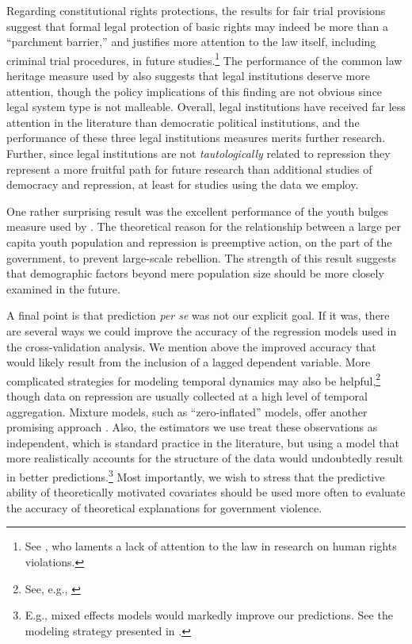 \documentclass[12pt]{article}
\begin{document}
Regarding constitutional rights protections, the results for fair trial provisions suggest that formal legal protection of basic rights may indeed be more than a ``parchment barrier,'' \citep[See][]{KeithTatePoe2009} and justifies more attention to the law itself, including criminal trial procedures, in future studies.\footnote{See \citet{Cross1999}, who laments a lack of attention to the law in research on human rights violations.} The performance of the common law heritage measure used by \citet{Mitchell2013} also suggests that legal institutions deserve more attention, though the policy implications of this finding are not obvious since legal system type is not malleable. Overall, legal institutions have received far less attention in the literature than democratic political institutions, and the performance of these three legal institutions measures merits further research. Further, since legal institutions are not {\it tautologically} related to repression they represent a more fruitful path for future research than additional studies of democracy and repression, at least for studies using the data we employ. 

One rather surprising result was the excellent performance of the youth bulges measure used by \citet{NordasDavenport2013}. The theoretical reason for the relationship between a large per capita youth population and repression is preemptive action, on the part of the government, to prevent large-scale rebellion. The strength of this result suggests that demographic factors beyond mere population size should be more closely examined in the future. 

A final point is that prediction {\it per se} was not our explicit goal. If it was, there are several ways we could improve the accuracy of the regression models used in the cross-validation analysis. We mention above the improved accuracy that would likely result from the inclusion of a lagged dependent variable. More complicated strategies for modeling temporal dynamics may also be helpful,\footnote{See, e.g., \citep{Brandtetal2011}} though data on repression are usually collected at a high level of temporal aggregation. Mixture models, such as ``zero-inflated'' models, offer another promising approach \citep[See, e.g.][]{Bagozzietal2013,Bagozzi2013}. Also, the estimators we use treat these observations as independent, which is standard practice in the literature, but using a model that more realistically accounts for the structure of the data would undoubtedly result in better predictions.\footnote{E.g., mixed effects models would markedly improve our predictions. See the modeling strategy presented in \citet{Wardetal2012}.} Most importantly, we wish to stress that the predictive ability of theoretically motivated covariates should be used more often to evaluate the accuracy of theoretical explanations for government violence.
\end{document}
